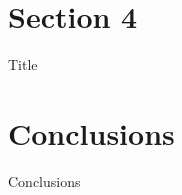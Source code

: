 \documentclass[12pt]{beamer}
\begin{document}
\section{Section 4}
\begin{frame}{Title}
    
\end{frame}

\section*{Conclusions}
\begin{frame}{Conclusions}
    
\end{frame}

%    
%    




\end{document}
